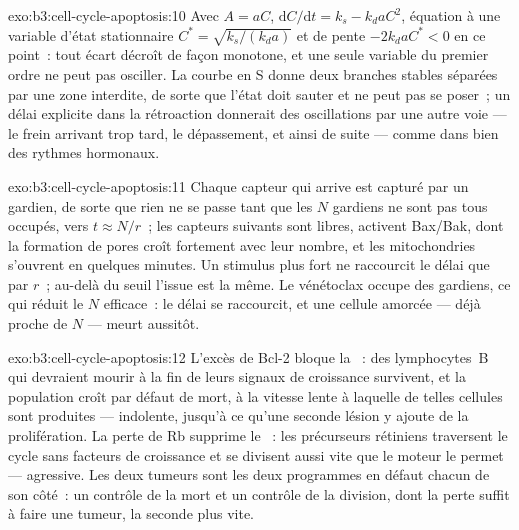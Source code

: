 \begin{solution}{exo:b3:cell-cycle-apoptosis:10}
Avec $A = aC$, $\mathrm{d}C/\mathrm{d}t = k_{s} - k_{d}aC^{2}$, équation
à une variable d'état stationnaire $C^{*} = \sqrt{k_{s}/(k_{d}a)}$ et de
pente $-2k_{d}aC^{*} < 0$ en ce point~: tout écart décroît de façon
monotone, et une seule variable du premier ordre ne peut pas osciller.
La courbe en S donne deux branches stables séparées par une zone
interdite, de sorte que l'état doit sauter et ne peut pas se poser~; un
délai explicite dans la rétroaction donnerait des oscillations par une
autre voie --- le frein arrivant trop tard, le dépassement, et ainsi de
suite --- comme dans bien des rythmes hormonaux.
\end{solution}

\begin{solution}{exo:b3:cell-cycle-apoptosis:11}
Chaque capteur qui arrive est capturé par un gardien, de sorte que rien
ne se passe tant que les $N$ gardiens ne sont pas tous occupés, vers
$t \approx N/r$~; les capteurs suivants sont libres, activent Bax/Bak,
dont la formation de pores croît fortement avec leur nombre, et les
mitochondries s'ouvrent en quelques minutes. Un stimulus plus fort ne
raccourcit le délai que par $r$~; au-delà du seuil l'issue est la même.
Le vénétoclax occupe des gardiens, ce qui réduit le $N$ efficace~: le
délai se raccourcit, et une cellule amorcée --- déjà proche de $N$ ---
meurt aussitôt.
\end{solution}

\begin{solution}{exo:b3:cell-cycle-apoptosis:12}
L'excès de Bcl-2 bloque la ~: des lymphocytes~B qui
devraient mourir à la fin de leurs signaux de croissance survivent, et
la population croît par défaut de mort, à la vitesse lente à laquelle
de telles cellules sont produites --- indolente, jusqu'à ce qu'une
seconde lésion y ajoute de la prolifération. La perte de Rb supprime le
~: les précurseurs rétiniens traversent le cycle
sans facteurs de croissance et se divisent aussi vite que le moteur le
permet --- agressive. Les deux tumeurs sont les deux programmes en
défaut chacun de son côté~: un contrôle de la mort et un contrôle de la
division, dont la perte suffit à faire une tumeur, la seconde plus
vite.
\end{solution}

